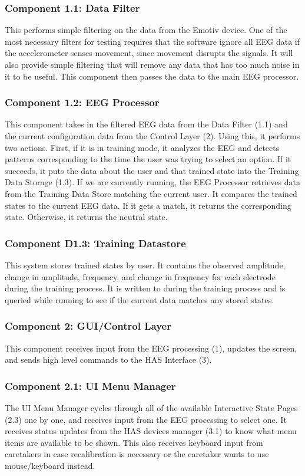 \documentclass{article}
\begin{document}
\subsubsection{Component 1.1: Data Filter}
This performs simple filtering on the data from the Emotiv device. One of
the most necessary filters for testing requires that the software ignore all
EEG data if the accelerometer senses movement, since movement disrupts the
signals. It will also provide simple filtering that will remove any data
that has too much noise in it to be useful. This component then passes the
data to the main EEG processor.

\subsubsection{Component 1.2: EEG Processor}
This component takes in the filtered EEG data from the Data Filter (1.1) and
the current configuration data from the Control Layer (2). Using this, it
performs two actions. First, if it is in training mode, it analyzes the EEG
and detects patterns corresponding to the time the user was trying to select
an option. If it succeeds, it puts the data about the user and that trained
state into the Training Data Storage (1.3). If we are currently running, the
EEG Processor retrieves data from the Training Data Store matching the current
user. It compares the trained states to the current EEG data. If it gets a
match, it returns the corresponding state. Otherwise, it returns the neutral
state.

\subsubsection{Component D1.3: Training Datastore}
This system stores trained states by user. It contains the observed amplitude,
change in amplitude, frequency, and change in frequency for each electrode
during the training process. It is written to during the training process and
is queried while running to see if the current data matches any stored states.

\subsubsection{Component 2: GUI/Control Layer}
This component receives input from the EEG processing (1), updates the screen,
and sends high level commands to the HAS Interface (3). 

\subsubsection{Component 2.1: UI Menu Manager}
The UI Menu Manager cycles through all of the available Interactive State Pages (2.3) one by one, and receives input from the EEG processing to select one. It receives status updates from the HAS devices manager (3.1) to know what menu items are available to be shown. This also receives keyboard input from caretakers in case recalibration is necessary or the caretaker wants to use mouse/keyboard instead.
\end{document}
